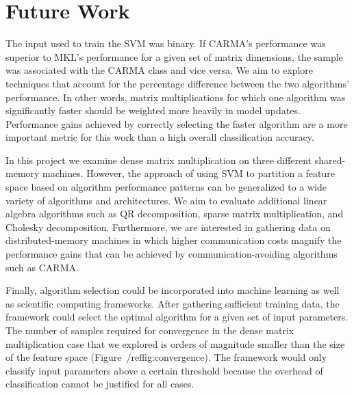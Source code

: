 \section{Future Work}
The input used to train the SVM was binary.
If CARMA's performance was superior to MKL's performance for a given set of matrix dimensions, the sample was associated with the CARMA class and vice versa.
We aim to explore techniques that account for the percentage difference between the two algorithms' performance.
In other words, matrix multiplications for which one algorithm was significantly faster should be weighted more heavily in model updates.
Performance gains achieved by correctly selecting the faster algorithm are a more important metric for this work than a high overall classification accuracy.

In this project we examine dense matrix multiplication on three different shared-memory machines.
However, the approach of using SVM to partition a feature space based on algorithm performance patterns can be generalized to a wide variety of algorithms and architectures.
We aim to evaluate additional linear algebra algorithms such as QR decomposition, sparse matrix multiplication, and Cholesky decomposition.
Furthermore, we are interested in gathering data on distributed-memory machines in which higher communication costs magnify the performance gains that can be achieved by communication-avoiding algorithms such as CARMA.

Finally, algorithm selection could be incorporated into machine learning as well as scientific computing frameworks.
After gathering sufficient training data, the framework could select the optimal algorithm for a given set of input parameters.
The number of samples required for convergence in the dense matrix multiplication case that we explored is orders of magnitude smaller than the size of the feature space (Figure~/ref{fig:convergence}).
The framework would only classify input parameters above a certain threshold because the overhead of classification cannot be justified for all cases.